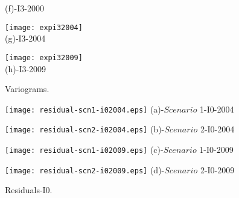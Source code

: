 \documentclass[Journal]{ascelike}
\begin{document}
\begin{figure}
\begin{minipage}[h]{0.5\linewidth}
			\footnotesize{(f)-I3-2000}
     \end{minipage}
\vspace{1.5mm}
    \begin{minipage}[h]{0.5\linewidth}
       \centering
       \texttt{[image: expi32004]}\\
			\footnotesize{(g)-I3-2004}
     \end{minipage}
\vspace{1.5mm}
    \begin{minipage}[h]{0.5\linewidth}
       \centering
       \texttt{[image: expi32009]}\\
			\footnotesize{(h)-I3-2009}
     \end{minipage}
		\caption{Variograms.}
\label{fig4}
\end{figure}


\begin{figure}
     \begin{minipage}[h]{0.5\linewidth}
        \centering
        \texttt{[image: residual-scn1-i02004.eps]}
				\footnotesize{(a)-$Scenario$ 1-I0-2004}
     \end{minipage}
\vspace{3.00mm}
    \begin{minipage}[h]{0.5\linewidth}
       \centering
       \texttt{[image: residual-scn2-i02004.eps]}
			\footnotesize{(b)-$Scenario$ 2-I0-2004}
     \end{minipage}
\vspace{3.00mm}
    \begin{minipage}[h]{0.5\linewidth}
       \centering
       \texttt{[image: residual-scn1-i02009.eps]}
			\footnotesize{(c)-$Scenario$ 1-I0-2009}
     \end{minipage}
\vspace{3.00mm}
    \begin{minipage}[h]{0.5\linewidth}
       \centering
       \texttt{[image: residual-scn2-i02009.eps]}
			\footnotesize{(d)-$Scenario$ 2-I0-2009}
     \end{minipage}
		\caption{Residuals-I0.}
\label{fig5}
\end{figure}
\end{document}

